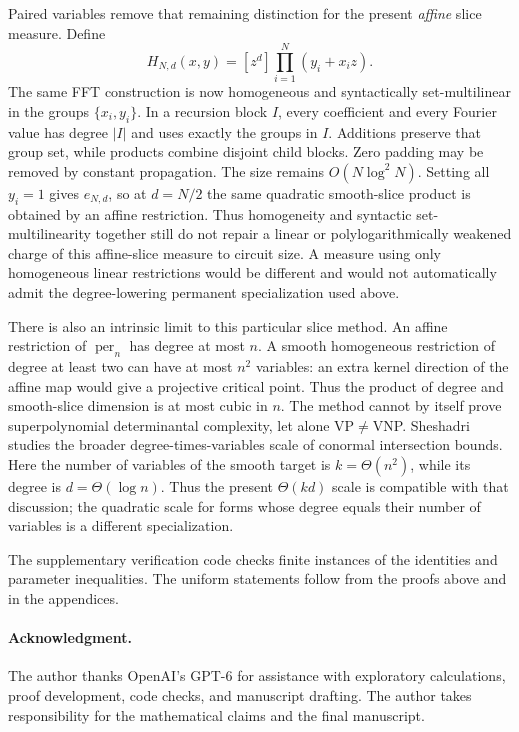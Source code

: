\documentclass[11pt]{article}
\theoremstyle{remark}\newtheorem{remark}[theorem]{Remark}
\DeclareMathOperator{\per}{per}
\begin{document}
Paired variables remove that remaining distinction for the present
\emph{affine} slice measure. Define
\[
 H_{N,d}(x,y)=[z^d]\prod_{i=1}^N(y_i+x_i z).
\]
The same FFT construction is now homogeneous and syntactically
set-multilinear in the groups $\{x_i,y_i\}$. In a recursion block $I$,
every coefficient and every Fourier value has degree $|I|$ and uses
exactly the groups in $I$. Additions preserve that group set, while
products combine disjoint child blocks. Zero padding may be removed
by constant propagation. The size remains $O(N\log^2 N)$. Setting
all $y_i=1$ gives $e_{N,d}$, so at $d=N/2$ the same quadratic
smooth-slice product is obtained by an affine restriction. Thus
homogeneity and syntactic set-multilinearity together still do not
repair a linear or polylogarithmically weakened charge of this
affine-slice measure to circuit size. A measure using only homogeneous
linear restrictions would be different and would not automatically
admit the degree-lowering permanent specialization used above.

There is also an intrinsic limit to this particular slice method.
An affine restriction of $\per_n$ has degree at most $n$. A smooth
homogeneous restriction of degree at least two can have at most $n^2$
variables: an extra kernel direction of the affine map would give a
projective critical point. Thus the product of degree and smooth-slice
dimension is at most cubic in $n$. The method cannot by itself prove
superpolynomial determinantal complexity, let alone VP$\ne$VNP.
Sheshadri~\cite{SheshadriReach} studies the broader degree-times-variables
scale of conormal intersection bounds. Here the number of variables of
the smooth target is $k=\Theta(n^2)$, while its degree is
$d=\Theta(\log n)$. Thus the present $\Theta(kd)$ scale is compatible
with that discussion; the quadratic scale for forms whose degree equals
their number of variables is a different specialization.

The supplementary verification code checks finite instances of the
identities and parameter inequalities. The uniform statements follow
from the proofs above and in the appendices.

\paragraph{Acknowledgment.}
The author thanks OpenAI's GPT-6 for assistance with exploratory
calculations, proof development, code checks, and manuscript drafting.
The author takes responsibility for the mathematical claims and the
final manuscript.
\end{document}
